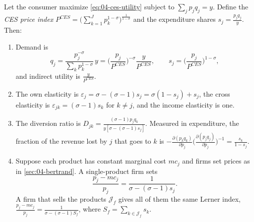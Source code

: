 \begin{proposition}\label{prop:04-ces}
Let the consumer maximize \eqref{eq:04-ces-utility} subject to $\sum_j p_jq_j = y$. Define the \emph{CES price index}
$P^{CES} = \big(\sum_{k=1}^J p_k^{1-\sigma}\big)^{\frac{1}{1-\sigma}}$ and the expenditure shares
$s_j = \frac{p_jq_j}{y}$. Then:
\begin{enumerate}[label=(\roman*)]
\item Demand is
\begin{equation}\label{eq:04-ces-demand}
q_j = \frac{p_j^{-\sigma}}{\sum_{k}p_k^{1-\sigma}}\,y = \Big(\frac{p_j}{P^{CES}}\Big)^{-\sigma}\frac{y}{P^{CES}},
\qquad
s_j = \Big(\frac{p_j}{P^{CES}}\Big)^{1-\sigma},
\end{equation}
and indirect utility is $\frac{y}{P^{CES}}$.
\item The own elasticity is $\varepsilon_j = \sigma - (\sigma - 1)s_j = \sigma(1 - s_j) + s_j$, the cross elasticity
is $\varepsilon_{jk} = (\sigma - 1)s_k$ for $k \ne j$, and the income elasticity is one.
\item The diversion ratio is $D_{jk} = \frac{(\sigma - 1)p_jq_k}{y[\sigma - (\sigma - 1)s_j]}$. Measured in
expenditure, the fraction of the revenue lost by $j$ that goes to $k$ is
$-\frac{\partial(p_kq_k)}{\partial p_j}\big(\frac{\partial(p_jq_j)}{\partial p_j}\big)^{-1} = \frac{s_k}{1 - s_j}$.
\item Suppose each product has constant marginal cost $mc_j$ and firms set prices as in \cref{sec:04-bertrand}. A
single-product firm sets
\begin{equation}\label{eq:04-ces-lerner}
\frac{p_j - mc_j}{p_j} = \frac{1}{\sigma - (\sigma - 1)s_j}.
\end{equation}
A firm that sells the products $\mathcal{J}_f$ gives all of them the same Lerner index,
$\frac{p_j - mc_j}{p_j} = \frac{1}{\sigma - (\sigma - 1)S_f}$, where $S_f = \sum_{k\in\mathcal{J}_f}s_k$.
\end{enumerate}
\end{proposition}

